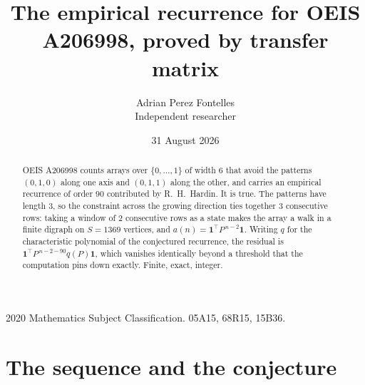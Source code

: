 \documentclass[11pt,a4paper]{article}
\title{The empirical recurrence for OEIS A206998, proved by transfer matrix}
\author{Adrian Perez Fontelles\\ \small Independent researcher}
\date{31 August 2026}
\theoremstyle{plain}
\theoremstyle{definition}
\begin{document}
\maketitle

\begin{abstract}
OEIS A206998 counts arrays over $\{0,\dots,1\}$ of width $6$ that avoid the patterns
$(0,1,0)$ along one axis and $(0,1,1)$ along the other, and carries an empirical recurrence of
order $90$ contributed by R.~H.~Hardin. It is true. The patterns have length $3$, so
the constraint across the growing direction ties together $3$ consecutive rows: taking a
window of $2$ consecutive rows as a state makes the array a walk in a finite digraph
on $S=1369$ vertices, and $a(n)=\mathbf{1}^{\!\top}P^{\,n-2}\mathbf{1}$. Writing $q$
for the characteristic polynomial of the conjectured recurrence, the residual is
$\mathbf{1}^{\!\top}P^{\,n-2-90}q(P)\mathbf{1}$, which vanishes identically
beyond a threshold that the computation pins down exactly. Finite, exact, integer.
\end{abstract}

\noindent\small 2020 Mathematics Subject Classification. 05A15, 68R15, 15B36.\normalsize

\section{The sequence and the conjecture}
\end{document}
